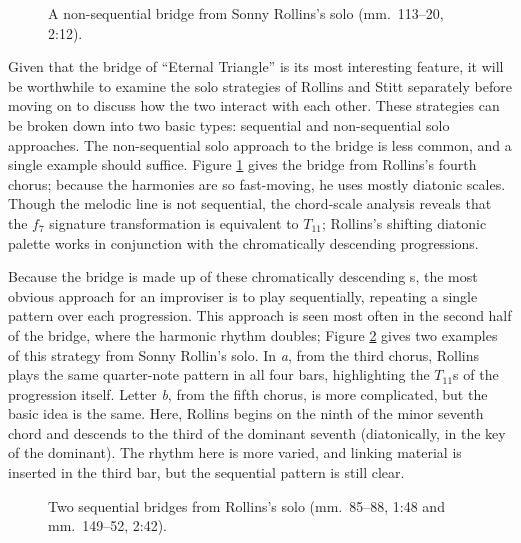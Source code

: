 \begin{figure}[tbp]
  \caption[A non-sequential bridge from Sonny Rollins's solo.]{%
    A non-sequential bridge from Sonny Rollins's solo (mm.~113--20, 2:12).}
  \label{et:sr-non-seq}
\end{figure}

Given that the bridge of ``Eternal Triangle'' is its most interesting feature,
it will be worthwhile to examine the solo strategies of Rollins and Stitt
separately before moving on to discuss how the two interact with each other.
These strategies can be broken down into two basic types: sequential and
non-sequential solo approaches. The non-sequential solo approach to the bridge
is less common, and a single example should suffice. Figure
\ref{et:sr-non-seq} gives the bridge from Rollins's fourth chorus;
because the harmonies are so fast-moving, he uses mostly diatonic scales.
Though the melodic line is not sequential, the chord-scale analysis reveals
that the $f_7$ signature transformation is equivalent to $T_{11}$; Rollins's
shifting diatonic palette works in conjunction with the chromatically
descending \tf progressions.

Because the bridge is made up of these chromatically descending \tf{}s, the most
obvious approach for an improviser is to play sequentially, repeating a single
pattern over each \tf progression. This approach is seen most often in the
second half of the bridge, where the harmonic rhythm doubles; Figure
\ref{et:sr-seq-bridge} gives two examples of this strategy from Sonny Rollin's
solo. In \emph{a}, from the third chorus, Rollins plays the same
quarter-note pattern in all four bars, highlighting the $T_{11}$s of the
progression itself. Letter \emph{b}, from the fifth chorus, is
more complicated, but the basic idea is the same. Here, Rollins begins on the
ninth of the minor seventh chord and descends to the third of the dominant
seventh (diatonically, in the key of the dominant). The rhythm here is more
varied, and linking material is inserted in the third bar, but the sequential
pattern is still clear.

\begin{figure}[tbp]
  \caption[Two sequential bridges from Rollins's solo.]{%
    Two sequential bridges from Rollins's solo (mm.~85--88, 1:48 and
    mm.~149--52, 2:42).}
  \label{et:sr-seq-bridge}
\end{figure}

